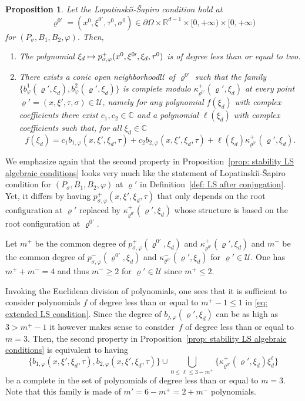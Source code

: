 \documentclass[10pt]{amsart}
\newcommand\mto{\mathchoice{\longmapsto}{\mapsto}{\mapsto}{\mapsto}}
\theoremstyle{plain}
\newtheorem{proposition}[theorem]{Proposition}
\theoremstyle{definition}
\def\R{\mathbb{R}}
\def\C{\mathbb{C}}
\newcommand{\LS}{Lopatinski\u{\i}-\v{S}apiro\xspace}
\newcommand{\nhd}{neighborhood\xspace}
\let\k\kappa
\let\y\varrho
\newcommand{\U}{\mathscr U}
\newcommand{\Psig}{P_{\sigma}}
\newcommand{\pconj}{p_{\sigma,\varphi}}
\begin{document}
\begin{proposition}
\label{prop: stability LS algebraic conditions}
Let the \LS condition hold at
\[
\y^{0\prime} = (x^0, \xi^{0\prime}, \tau^0, \sigma^0)\in \partial
\Omega \times \R^{d-1}\times [0,+\infty) \times [0,+\infty)
\]
for
$(\Psig, B_1, B_2, \varphi)$. Then,
\begin{enumerate}
\item The polynomial
$\xi_d \mto \pconj^+(x^0,
\xi^{0\prime}, \xi_d, \tau^0)$ is of degree less than or equal to
two.
\item There exists a conic open \nhd $\U$ of $\y^{0\prime}$ such that
the family
$\{b^1_{\varphi}(\y',\xi_d),b^2_{\varphi}(\y',\xi_d)\}$ is complete
modulo $\k^+_{\y^{0\prime}} (\y',\xi_d)$ at every point \hbox{$\y' \!=\! (x,\xi',
\tau, \sigma)\!\in\!\U\!\!$,}
namely for
any polynomial $f(\xi_d)$ with complex coefficients there
exist $c_1, c_2\in\C$ and a polynomial
$\ell(\xi_d)$ with complex coefficients such that, for all
$\xi_d\in\C$
\begin{equation}
\label{eq: extended LS condition}
f(\xi_d)=c_1 b_{1,\varphi}(x,\xi',\xi_d,\tau)
+c_2b_{2,\varphi}(x,\xi',\xi_d,\tau)
+\ell(\xi_d) \k^+_{\y^{0\prime}}(\y',\xi_d).
\end{equation}
\end{enumerate}
\end{proposition}
We emphasize again that the second property in Proposition~\ref{prop:
stability LS algebraic conditions} looks very much like the
statement of \LS condition for $(\Psig, B_1, B_2, \varphi)$ at $\y'$
in Definition~\ref{def: LS after conjugation}. Yet, it differs by
having $\pconj^+(x,\xi',\xi_d,\tau)$ that only depends on the root configuration at $\y'$ replaced
by $ \k^+_{\y^{0\prime}}(\y',\xi_d)$ whose structure is based on the
root configuration at $\y^{0\prime}$.

Let $m^+$ be the common degree of $\pconj^+(\y^{0\prime},\xi_d)$ and
$\k^+_{\y^{0\prime}} (\y',\xi_d)$ and
$m^-$ be the common degree of $\pconj^-(\y^{0\prime},\xi_d)$ and
$\k^-_{\y^{0\prime}} (\y',\xi_d)$ for $\y'\in \U$. One has $m^+ + m^-
= 4$ and thus $m^- \geq 2$ for $\y'\in \U$ since $m^+ \leq 2$.

Invoking the Euclidean division of polynomials, one sees that it is
sufficient to consider polynomials $f$ of degree less than or equal to
$m^+-1\leq 1$ in \eqref{eq: extended LS condition}.
Since the degree of $b_{j,\varphi} (\y',\xi_d)$ can be as high as
$3> m^+-1$ it however makes sense to consider~$f$ of degree less than or equal to
$m=3$. Then, the second property in Proposition~\ref{prop:
stability LS algebraic conditions} is equivalent to having
\begin{equation*}
\{ b_{1,\varphi}(x,\xi',\xi_d,\tau),
b_{2,\varphi}(x,\xi',\xi_d,\tau)\} \cup \bigcup_{0 \leq \ell \leq
3- m^+} \{
\k^+_{\y^{0\prime}}(\y',\xi_d) \xi_d^\ell\}
\end{equation*}
be a complete in the set of polynomials of degree less than or equal to
$m=3$. Note that this family is made of $m' = 6- m^+ = 2 + m^-$
polynomials.
\end{document}
